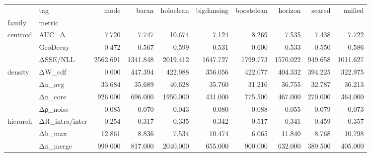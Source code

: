 \begin{tabular}{@{}llrrrrrrrr@{}}
\toprule
 & tag & mode & baran & holoclean & bigdansing & boostclean & horizon & scared & unified \\
family & metric &  &  &  &  &  &  &  &  \\
\midrule
\multirow[t]{3}{*}{centroid} & AUC_Δ & 7.720 & 7.747 & 10.674 & 7.124 & 8.269 & 7.535 & 7.438 & 7.722 \\
 & GeoDecay & 0.472 & 0.567 & 0.599 & 0.531 & 0.600 & 0.533 & 0.550 & 0.586 \\
 & ΔSSE/NLL & 2562.691 & 1341.848 & 2019.412 & 1647.727 & 1799.773 & 1570.022 & 949.658 & 1011.627 \\
\cline{1-10}
\multirow[t]{4}{*}{density} & ΔW_cdf & 0.000 & 447.394 & 422.988 & 356.056 & 422.077 & 404.332 & 394.225 & 322.975 \\
 & Δn_avg & 33.684 & 35.689 & 40.628 & 35.760 & 31.216 & 36.755 & 32.787 & 36.213 \\
 & Δn_core & 926.000 & 696.000 & 1950.000 & 431.000 & 775.500 & 467.000 & 270.000 & 364.000 \\
 & Δρ_noise & 0.085 & 0.070 & 0.043 & 0.080 & 0.088 & 0.055 & 0.079 & 0.073 \\
\cline{1-10}
\multirow[t]{3}{*}{hierarch} & ΔR_intra/inter & 0.254 & 0.317 & 0.335 & 0.342 & 0.517 & 0.341 & 0.459 & 0.357 \\
 & Δh_max & 12.861 & 8.836 & 7.534 & 10.474 & 6.065 & 11.840 & 8.768 & 10.798 \\
 & Δn_merge & 999.000 & 817.000 & 2040.000 & 655.000 & 900.000 & 632.000 & 389.500 & 405.000 \\
\cline{1-10}
\bottomrule
\end{tabular}
